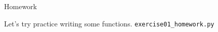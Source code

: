 \documentclass[a4paper, draft=False]{scrartcl}
\begin{document}
\newpage
\begin{exam}[Homework]{Homework}
  \begin{instructions}
    Let's try practice writing some functions. \texttt{exercise01\_homework.py}
  \end{instructions}
\end{exam}
\end{document}
